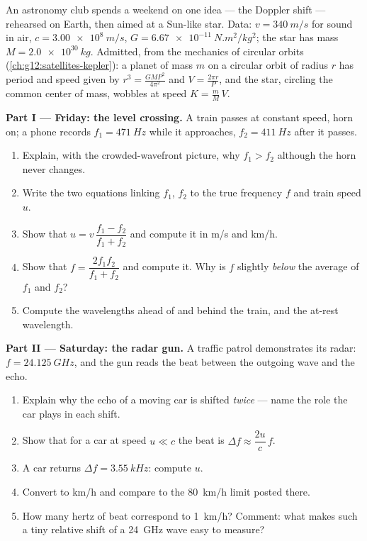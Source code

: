 \begin{problem}
\label{pb:g12:doppler-effect:1}
An astronomy club spends a weekend on one idea --- the Doppler shift --- rehearsed on Earth,
then aimed at a Sun-like star. Data: $v = \qty{340}{m/s}$ for sound in air,
$c = \qty{3.00e8}{m/s}$, $G = \qty{6.67e-11}{N.m^2/kg^2}$; the star has mass
$M = \qty{2.0e30}{kg}$. Admitted, from the mechanics of circular orbits
(\cref{ch:g12:satellites-kepler}): a planet of mass $m$ on a circular orbit of radius $r$
has period and speed given by $r^3 = \frac{G M P^2}{4\pi^2}$ and $V = \frac{2\pi r}{P}$,
and the star, circling the common center of mass, wobbles at speed $K = \frac{m}{M}\,V$.

\medskip
\noindent\textbf{Part I --- Friday: the level crossing.}
A train passes at constant speed, horn on; a phone records $f_1 = \qty{471}{Hz}$ while it
approaches, $f_2 = \qty{411}{Hz}$ after it passes.
\begin{enumerate}
  \item Explain, with the crowded-wavefront picture, why $f_1 > f_2$ although the horn never changes.
  \item Write the two equations linking $f_1$, $f_2$ to the true frequency $f$ and train speed $u$.
  \item Show that $u = v\,\dfrac{f_1 - f_2}{f_1 + f_2}$ and compute it in \unit{m/s} and \unit{km/h}.
  \item Show that $f = \dfrac{2 f_1 f_2}{f_1 + f_2}$ and compute it. Why is $f$ slightly
        \emph{below} the average of $f_1$ and $f_2$?
  \item Compute the wavelengths ahead of and behind the train, and the at-rest wavelength.
\end{enumerate}

\medskip
\noindent\textbf{Part II --- Saturday: the radar gun.}
A traffic patrol demonstrates its radar: $f = \qty{24.125}{GHz}$, and the gun reads the
beat between the outgoing wave and the echo.
\begin{enumerate}[resume]
  \item Explain why the echo of a moving car is shifted \emph{twice} --- name the role the
        car plays in each shift.
  \item Show that for a car at speed $u \ll c$ the beat is $\Delta f \approx \dfrac{2u}{c}\,f$.
  \item A car returns $\Delta f = \qty{3.55}{kHz}$: compute $u$.
  \item Convert to \unit{km/h} and compare to the \qty{80}{km/h} limit posted there.
  \item How many hertz of beat correspond to \qty{1}{km/h}? Comment: what makes such a tiny
        relative shift of a \qty{24}{GHz} wave easy to measure?
\end{enumerate}


\end{problem}
